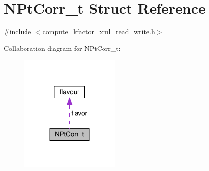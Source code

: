 \hypertarget{structNPtCorr__t}{}\section{N\+Pt\+Corr\+\_\+t Struct Reference}
\label{structNPtCorr__t}


{\ttfamily \#include $<$compute\+\_\+kfactor\+\_\+xml\+\_\+read\+\_\+write.\+h$>$}



Collaboration diagram for N\+Pt\+Corr\+\_\+t\+:\nopagebreak
\begin{figure}[H]
\begin{center}
\leavevmode
\includegraphics[width=140pt]{d5/dfb/structNPtCorr__t__coll__graph}
\end{center}
\end{figure}
